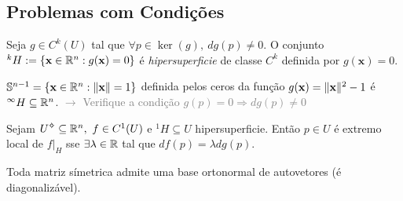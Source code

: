 \subsection{Problemas com Condições}

\begin{definition}
    Seja  \(g\in C^k(U)\) tal que \(\forall p \in \ker (g), \ dg(p)\neq 0\). O conjunto \(^k H:= \{\textbf{x} \in \mathbb{R}^n : g(\textbf{x}) = 0\}\) é \emph{hipersuperficie} de classe \(C^k\) definida por \(g(\textbf{x})=0\). 
\end{definition}

\begin{example}
    \(\mathbb{S}^{n-1} = \{\textbf{x}\in \mathbb{R}^n: \|\textbf{x}\| = 1\}\) definida pelos ceros da função \(g(\textbf{x})= \|\textbf{x}\|^2- 1 \) é \(^\infty H \subseteq \mathbb{R}^n\). \textcolor{gray}{\(\rightarrow \) Verifique a condição \(g(p)=0 \Rightarrow dg(p)\neq 0\)} 
\end{example}

\Ef

\begin{theorem}
    Sejam \(U\ab \subseteq \R^n, \ f \in C^1(U)\) e \(^1 H\subseteq U\) hipersuperficie. Então \(p\in U\) é extremo local de \(f\Big|_H\) sse \(\exists \lambda \in \mathbb{R}\) tal que \(df(p) =\lambda dg(p)\).   
\end{theorem} 


\begin{theorem}
    Toda matriz símetrica admite uma base ortonormal de autovetores (é diagonalizável). %
\end{theorem}
